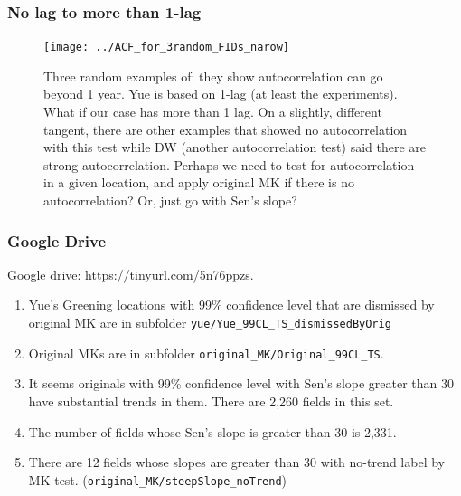 \documentclass[serif, xcolor={dvipsnames}]{beamer} %
\def\code#1{{\scriptsize\texttt{#1}}}
\begin{document}
\begin{frame}
\frametitle{No lag to more than 1-lag}

\begin{figure}[H]
\centering
\texttt{[image: ../ACF\_for\_3random\_FIDs\_narow]}
\captionsetup{singlelinecheck=false} 
\caption*{Three random examples of: they show autocorrelation can go beyond 1 year. 
Yue is based on 1-lag (at least the experiments). What if our case has more than 1 lag.
On a slightly, different tangent, there are other examples that showed 
no autocorrelation with this test 
while DW (another autocorrelation test) said there are strong autocorrelation.
Perhaps we need to test for autocorrelation in a given location,
and apply original MK if there is no autocorrelation? Or, just go with Sen's slope?}
\label{fig:ACF_for_3random_FIDs_narow}
\end{figure}
\end{frame}
\begin{frame}[t]
\frametitle{Google Drive}
Google drive: \url{https://tinyurl.com/5n76ppzs}.

\begin{enumerate}
\item Yue's Greening locations with 99\% confidence level that are dismissed by original MK
are in subfolder \code{yue/Yue\_99CL\_TS\_dismissedByOrig} 

\item Original MKs are in
subfolder \code{original\_MK/Original\_99CL\_TS}.

\item It seems originals with 99\% confidence level with Sen's slope greater than
30 have substantial trends in them. There are 2,260 fields in this set.

\item The number of fields whose Sen's slope is greater than 30 is 2,331.\\

\item There are 12 fields whose slopes are greater than 30 with no-trend label by MK test. (\code{original\_MK/steepSlope\_noTrend})


\end{enumerate}

\end{frame}


\end{document}
